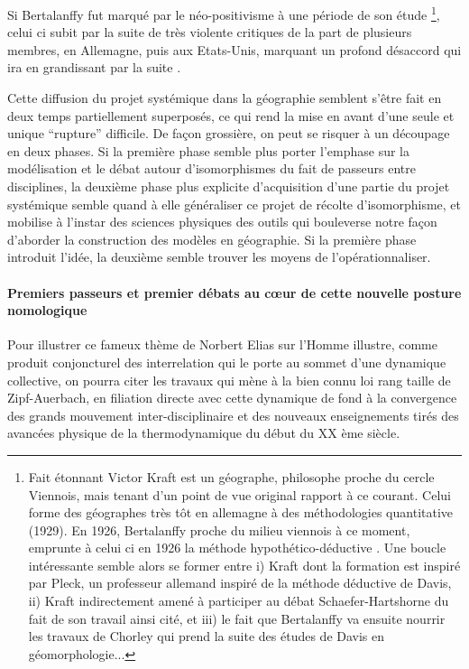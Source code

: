 Si Bertalanffy fut marqué par le néo-positivisme à une période de son étude \footnote{Fait étonnant Victor Kraft est un géographe, philosophe proche du cercle Viennois, mais tenant d'un point de vue original rapport à ce courant. Celui forme des géographes très tôt en allemagne à des méthodologies quantitative (1929). En 1926, Bertalanffy proche du milieu viennois à ce moment, emprunte à celui ci en 1926 la méthode hypothético-déductive \autocite[342]{Pouvreau2013}. Une boucle intéressante semble alors se former entre i) Kraft dont la formation est inspiré par Pleck, un professeur allemand inspiré de la méthode déductive de Davis, ii) Kraft indirectement amené à participer au débat Schaefer-Hartshorne du fait de son travail ainsi cité, et iii) le fait que Bertalanffy va ensuite nourrir les travaux de Chorley qui prend la suite des études de Davis en géomorphologie...}, celui ci subit par la suite de très violente critiques de la part de plusieurs membres, en Allemagne, puis aux Etats-Unis, marquant un profond désaccord qui ira en grandissant par la suite \autocite[26-27]{Pouvreau2006}. 

Cette diffusion du projet systémique dans la géographie semblent s'être fait en deux temps partiellement superposés, ce qui rend la mise en avant d'une seule et unique \enquote{rupture} difficile. De façon grossière, on peut se risquer à un découpage en deux phases. Si la première phase semble plus porter l'emphase sur la modélisation et le débat autour d'isomorphismes du fait de passeurs entre disciplines, la deuxième phase plus explicite d'acquisition d'une partie du projet systémique semble quand à elle généraliser ce projet de récolte d'isomorphisme, et mobilise à l'instar des sciences physiques des outils qui bouleverse notre façon d'aborder la construction des modèles en géographie. Si la première phase introduit l'idée, la deuxième semble trouver les moyens de l’opérationnaliser.

\paragraph{Premiers passeurs et premier débats au cœur de cette nouvelle posture nomologique}

Pour illustrer ce fameux thème de Norbert Elias \autocite[31-33]{Delmotte2010} \textcite{Elias1991} sur l'Homme illustre, comme produit conjoncturel des interrelation qui le porte au sommet d'une dynamique collective, on pourra citer les travaux qui mène à la bien connu loi rang taille de Zipf-Auerbach, en filiation directe avec cette dynamique de fond à la convergence des grands mouvement inter-disciplinaire et des nouveaux enseignements tirés des avancées physique de la thermodynamique du début du XX ème siècle.

